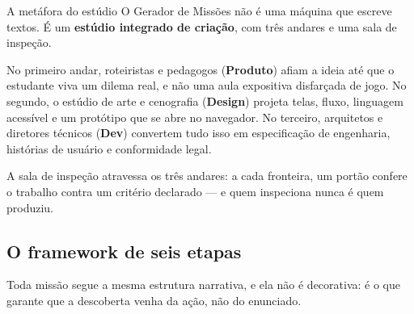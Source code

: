 \documentclass[11pt,a4paper]{article}
\begin{document}
\begin{caixaConceito}{A metáfora do estúdio}
O Gerador de Missões não é uma máquina que escreve textos. É um \textbf{estúdio integrado de criação}, com três andares e uma sala de inspeção.

No primeiro andar, roteiristas e pedagogos (\textbf{Produto}) afiam a ideia até que o estudante viva um dilema real, e não uma aula expositiva disfarçada de jogo. No segundo, o estúdio de arte e cenografia (\textbf{Design}) projeta telas, fluxo, linguagem acessível e um protótipo que se abre no navegador. No terceiro, arquitetos e diretores técnicos (\textbf{Dev}) convertem tudo isso em especificação de engenharia, histórias de usuário e conformidade legal.

A sala de inspeção atravessa os três andares: a cada fronteira, um portão confere o trabalho contra um critério declarado --- e quem inspeciona nunca é quem produziu.
\end{caixaConceito}

\subsection{O framework de seis etapas}

Toda missão segue a mesma estrutura narrativa, e ela não é decorativa: é o que garante que a descoberta venha da ação, não do enunciado.
\end{document}
